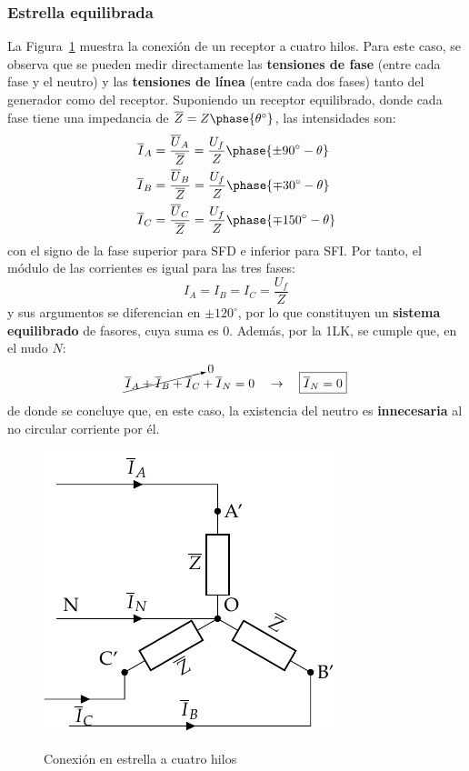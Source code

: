 	\subsubsection{Estrella equilibrada}
	La Figura~\ref{fig.conexion_estrella_4} muestra la conexión de un receptor a cuatro hilos. Para este caso, se observa que se pueden medir directamente las \textbf{tensiones de fase} (entre cada fase y el neutro) y las \textbf{tensiones de línea} (entre cada dos fases) tanto del generador como del receptor. Suponiendo un receptor equilibrado, donde cada fase tiene una impedancia de $\overline{Z}=Z\phase{\theta^\circ}$, las intensidades son:
	\begin{align*}
      \overline{I}_A &= \dfrac{\overline{U}_A}{\overline{Z}} = \dfrac{U_f}{Z}\phase{\pm 90^\circ - \theta} \\
      \overline{I}_B &= \frac{\overline{U}_B}{\overline{Z}} = \frac{U_f}{Z}\phase{{\mp 30^\circ} - \theta}\\
      \overline{I}_C &= \frac{\overline{U}_C}{\overline{Z}} = \frac{U_f}{Z}\phase{{\mp 150^\circ} - \theta}
    \end{align*}
    con el signo de la fase superior para SFD e inferior para SFI. Por tanto, el módulo de las corrientes es igual para las tres fases: 
    \begin{equation}
        \boxed{I_A = I_B = I_C = \dfrac{U_f}{Z}}
    \end{equation}
    y sus argumentos se diferencian en $\pm120^\circ$, por lo que constituyen un \textbf{sistema equilibrado} de fasores, cuya suma es 0. Además, por la 1LK, se cumple que, en el nudo $N$: 
    \begin{equation}
        \cancelto{0}{\overline{I}_A  + \overline{I}_B + \overline{I}_C} + \overline{I}_N = 0 \quad\rightarrow\quad \boxed{\overline{I}_N = 0}
    \end{equation}
    de donde se concluye que, en este caso, la existencia del neutro es \textbf{innecesaria} al no circular corriente por él. 
	\begin{figure}[H]
		\centering
		{\includegraphics{../figs/EstrellaEquilibrado_Receptor.pdf}}
		\caption{Conexión en estrella a cuatro hilos}
		\label{fig.conexion_estrella_4}
	\end{figure}
	
